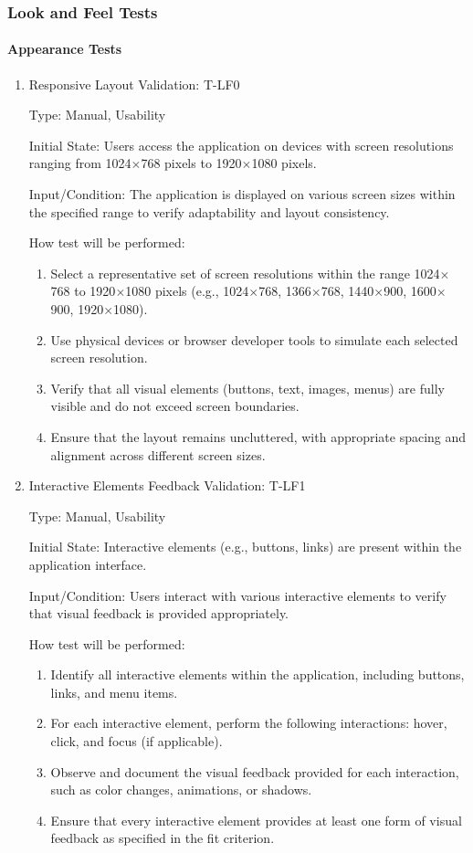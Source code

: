 \documentclass[12pt, titlepage]{article}
\begin{document}
\subsubsection{Look and Feel Tests}
\paragraph{Appearance Tests}
\begin{enumerate}
\item{Responsive Layout Validation: T-LF0\\}

Type: Manual, Usability

Initial State: Users access the application on devices with screen resolutions ranging from 1024$\times$768 pixels to 1920$\times$1080 pixels.

Input/Condition: The application is displayed on various screen sizes within the specified range to verify adaptability and layout consistency.

How test will be performed:
\begin{enumerate}
    \item Select a representative set of screen resolutions within the range 1024$\times$768 to 1920$\times$1080 pixels (e.g., 1024$\times$768, 1366$\times$768, 1440$\times$900, 1600$\times$900, 1920$\times$1080).
    \item Use physical devices or browser developer tools to simulate each selected screen resolution.
    \item Verify that all visual elements (buttons, text, images, menus) are fully visible and do not exceed screen boundaries.
    \item Ensure that the layout remains uncluttered, with appropriate spacing and alignment across different screen sizes.
\end{enumerate}

\item{Interactive Elements Feedback Validation: T-LF1\\}

Type: Manual, Usability

Initial State: Interactive elements (e.g., buttons, links) are present within the application interface.

Input/Condition: Users interact with various interactive elements to verify that visual feedback is provided appropriately.

How test will be performed:
\begin{enumerate}
    \item Identify all interactive elements within the application, including buttons, links, and menu items.
    \item For each interactive element, perform the following interactions: hover, click, and focus (if applicable).
    \item Observe and document the visual feedback provided for each interaction, such as color changes, animations, or shadows.
    \item Ensure that every interactive element provides at least one form of visual feedback as specified in the fit criterion.
\end{enumerate}


\end{enumerate}
\end{document}
